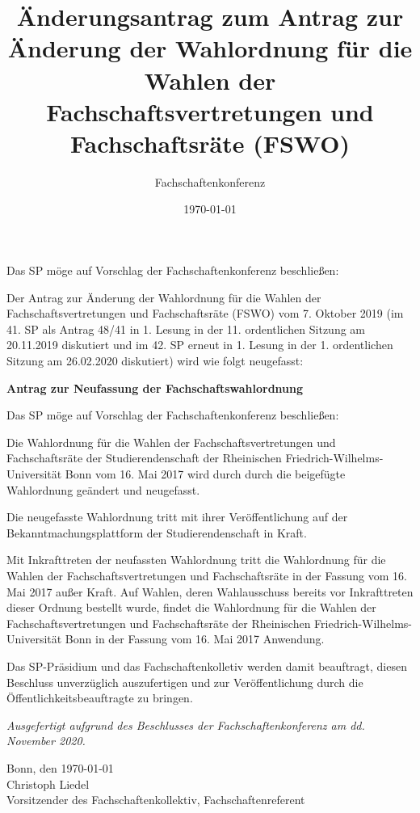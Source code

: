 \documentclass[DIV=12, parskip=half, fontsize=12pt, a4paper]{scrartcl}
\title{Änderungsantrag zum Antrag zur Änderung der Wahlordnung für die Wahlen der Fachschaftsvertretungen und Fachschaftsräte (FSWO)}
\author{Fachschaftenkonferenz}
\date{\today}
\begin{document}
	\maketitle
	Das SP möge auf Vorschlag der Fachschaftenkonferenz beschließen:

	\begin{linenumbers}
		Der Antrag zur Änderung der Wahlordnung für die Wahlen der Fachschaftsvertretungen und Fachschaftsräte (FSWO) vom 7. Oktober 2019 (im 41. SP als Antrag 48/41 in 1. Lesung in der 11. ordentlichen Sitzung am 20.11.2019 diskutiert und im 42. SP erneut in 1. Lesung in der 1. ordentlichen Sitzung am 26.02.2020 diskutiert) wird wie folgt neugefasst:

		\begin{center}\bfseries\LARGE Antrag zur Neufassung der Fachschaftswahlordnung
		\end{center}

		Das SP möge auf Vorschlag der Fachschaftenkonferenz beschließen:

		Die Wahlordnung für die Wahlen der Fachschaftsvertretungen und Fachschaftsräte der Studierendenschaft der Rheinischen Friedrich-Wilhelms-Universität Bonn vom 16. Mai 2017 wird durch durch die beigefügte Wahlordnung geändert und neugefasst.

		Die neugefasste Wahlordnung tritt mit ihrer Veröffentlichung auf der Bekanntmachungsplattform der Studierendenschaft in Kraft.

		Mit Inkrafttreten der neufassten Wahlordnung tritt die Wahlordnung für die Wahlen der Fachschaftsvertretungen und Fachschaftsräte in der Fassung vom 16. Mai 2017 außer Kraft.
		Auf Wahlen, deren Wahlausschuss bereits vor Inkrafttreten dieser Ordnung bestellt wurde, findet die Wahlordnung für die Wahlen der Fachschaftsvertretungen und Fachschaftsräte der Rheinischen Friedrich-Wilhelms-Universität 	Bonn in der Fassung vom 16. Mai 2017 Anwendung.

		Das  SP-Präsidium und das Fachschaftenkolletiv  werden  damit  beauftragt,  diesen Beschluss unverzüglich auszufertigen und zur Veröffentlichung durch die Öffentlichkeitsbeauftragte zu bringen.
	\end{linenumbers}

	\vspace{1em}
	\textit{Ausgefertigt aufgrund des Beschlusses der Fachschaftenkonferenz am dd. November 2020.}

	Bonn, den \today \\
	Christoph Liedel \\
	{\scriptsize Vorsitzender des Fachschaftenkollektiv, Fachschaftenreferent}

	\clearpage
	
\end{document}
